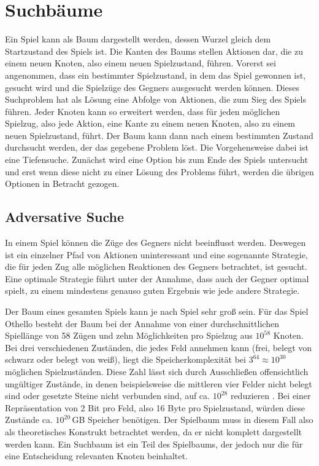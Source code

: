 \section{Suchbäume}
\label{sec:gametree}

Ein Spiel kann als Baum dargestellt werden, dessen Wurzel gleich dem Startzustand des Spiels ist. Die Kanten des Baums
stellen Aktionen dar, die zu einem neuen Knoten, also einem neuen Spielzustand, führen. Vorerst sei angenommen, dass ein
bestimmter Spielzustand, in dem das Spiel gewonnen ist, gesucht wird und die Spielzüge des Gegners ausgesucht werden
können. Dieses Suchproblem hat als Lösung eine Abfolge von Aktionen, die zum Sieg des Spiels führen. Jeder Knoten kann
so erweitert werden, dass für jeden möglichen Spielzug, also jede Aktion, eine Kante zu einem neuen Knoten, also zu
einem neuen Spielzustand, führt. Der Baum kann dann nach einem bestimmten Zustand durchsucht werden, der das gegebene
Problem löst. Die Vorgehensweise dabei ist eine Tiefensuche. Zunächst wird eine Option bis zum Ende des Spiels
untersucht und erst wenn diese nicht zu einer Lösung des Problems führt, werden die übrigen Optionen in Betracht
gezogen.
\cite[S.~75]{ai2010russel}

\subsection{Adversative Suche}
In einem Spiel können die Züge des Gegners nicht beeinflusst werden. Deswegen ist ein einzelner Pfad von Aktionen
uninteressant und eine sogenannte Strategie, die für jeden Zug alle möglichen Reaktionen des Gegners betrachtet, ist
gesucht. Eine optimale Strategie führt unter der Annahme, dass auch der Gegner optimal spielt, zu einem mindestens
genauso guten Ergebnis wie jede andere Strategie.
\cite[S.~163f.]{ai2010russel}

Der Baum eines gesamten Spiels kann je nach Spiel sehr groß sein. Für das Spiel Othello besteht der Baum bei der Annahme
von einer durchschnittlichen Spiellänge von 58 Zügen und zehn Möglichkeiten pro Spielzug aus $10^{58}$ Knoten. Bei drei
verschiedenen Zuständen, die jedes Feld annehmen kann (frei, belegt von schwarz oder belegt von weiß), liegt die
Speicherkomplexität bei $3^{64}\approx10^{30}$ möglichen Spielzuständen. Diese Zahl lässt sich durch Ausschließen
offensichtlich ungültiger Zustände, in denen beispielsweise die mittleren vier Felder nicht belegt sind oder gesetzte
Steine nicht verbunden sind, auf ca. $10^{28}$ reduzieren \cite[S.~167]{searchingforsolutions}.
Bei einer Repräsentation von 2 Bit pro Feld, also 16 Byte pro Spielzustand, würden diese Zustände ca. $10^{20}$\,GB
Speicher benötigen. Der Spielbaum muss in diesem Fall also als theoretisches Konstrukt betrachtet werden, da er nicht
komplett dargestellt werden kann. Ein Suchbaum ist ein Teil des Spielbaums, der jedoch nur die für eine Entscheidung
relevanten Knoten beinhaltet.
\cite[S.~162f.]{ai2010russel}

